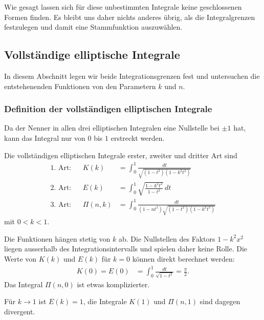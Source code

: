 Wie gesagt lassen sich für diese unbestimmten Integrale keine 
geschlossenen Formen finden.
Es bleibt uns daher nichts anderes übrig, als die Integralgrenzen
festzulegen und damit eine Stammfunktion auszuwählen.

%
%
\subsection{Vollständige elliptische Integrale
\label{buch:elliptisch:subsection:vollstaendig}}
In diesem Abschnitt legen wir beide Integrationsgrenzen fest und
untersuchen die entstehenenden Funktionen von den Parametern
$k$ und $n$.

\subsubsection{Definition der vollständigen elliptischen Integrale}
Da der Nenner in allen drei elliptischen Integralen eine Nullstelle
bei $\pm1$ hat, kann das Integral nur von $0$ bis $1$ erstreckt werden.

\begin{definition}
\label{buch:elliptisch:def:vollstintegrale123}
Die vollständigen elliptischen Integrale erster, zweiter und dritter
Art sind
\[
\begin{aligned}
\text{1.~Art:}&&
K(k)&=\int_0^1 \frac{dt}{\sqrt{(1-t^2)(1-k^2t^2)}} \\
\text{2.~Art:}&&
E(k)&=\int_0^1 \sqrt{\frac{1-k^2t^2}{1-t^2}}\,dt \\
\text{3.~Art:}&&
\Pi(n, k)&=\int_0^1\frac{dt}{(1-nt^2)\sqrt{(1-t^2)(1-k^2t^2)}} 
\end{aligned}
\]
mit $0<k<1$.
\end{definition}

Die Funktionen hängen stetig von $k$ ab.
Die Nullstellen des Faktors $1-k^2x^2$ liegen ausserhalb des
Integrationsintervalls und spielen daher keine Rolle.
Die Werte von $K(k)$ und $E(k)$ für $k=0$ können direkt berechnet
werden:
\begin{align*}
K(0)
=
E(0)
&=
\int_0^1 \frac{dt}{\sqrt{1-t^2}}=\frac{\pi}2.
\end{align*}
Das Integral $\Pi(n,0)$ ist etwas komplizierter.

Für $k\to 1$ ist $E(k)=1$, die Integrale $K(1)$ und $\Pi(n,1)$
sind dagegen divergent.

